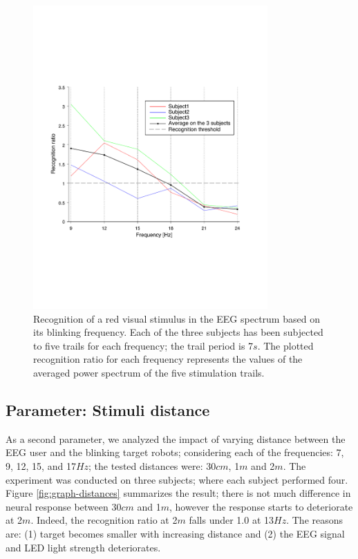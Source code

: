 \documentclass{svmult}
\begin{document}
\begin{figure}
\center
\includegraphics[width=0.8\textwidth]{figures/graph-frequences.pdf}
\caption{Recognition of a red visual stimulus in the EEG spectrum based on its blinking frequency. Each of the three subjects has been subjected to five trails for each frequency; the trail period is 7$s$. The plotted recognition ratio for each frequency represents the values of the averaged power spectrum of the five stimulation trails.} \label{fig:graph-frequences}
\end{figure}

\subsection{Parameter: Stimuli distance}
As a second parameter, we analyzed the impact of varying distance between the EEG user and the blinking target robots; considering each of the frequencies: 7, 9, 12, 15, and 17$Hz$; the tested distances were: 30$cm$, 1$m$ and 2$m$. The experiment was conducted on three subjects; where each subject performed four. Figure \ref{fig:graph-distances} summarizes the result; there is not much difference in neural response between 30$cm$ and 1$m$, however the response starts to deteriorate at 2$m$. Indeed, the recognition ratio at 2$m$ falls under 1.0 at 13$Hz$. The reasons are: (1) target becomes smaller with increasing distance and (2) the EEG signal and LED light strength deteriorates.
\end{document}
